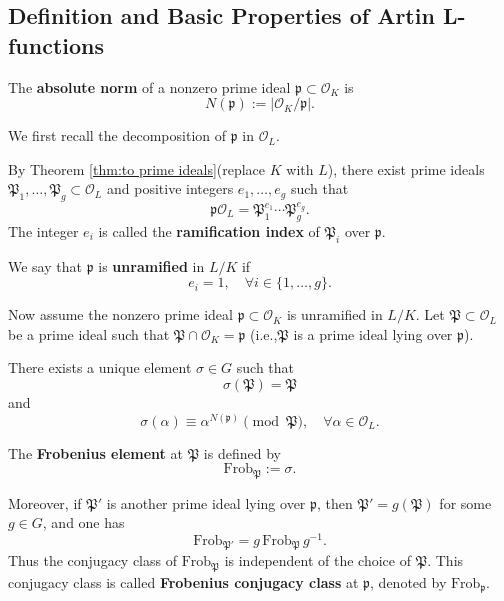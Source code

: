 \subsection{Definition and Basic Properties of Artin L-functions}


\begin{defn}
The \textbf{absolute norm} of  a nonzero prime ideal $\mathfrak p\subset\mathcal O_K$ is 
\[
{N(\mathfrak p) := |\mathcal O_K/\mathfrak p|.}
\]
\end{defn}

We first recall the decomposition of \(\mathfrak{p}\) in \(\mathcal{O}_L\).
\begin{defn}
By Theorem \ref{thm:to prime ideals}(replace $K$ with $L$), there exist prime ideals \(\mathfrak{P}_1, \dots, \mathfrak{P}_g \subset \mathcal{O}_L\) and positive integers \(e_1, \dots, e_g\) such that
\[
\mathfrak{p}\mathcal{O}_L = \mathfrak{P}_1^{e_1} \cdots \mathfrak{P}_g^{e_g}.
\]
The integer \(e_i\) is called the \textbf{ramification index} of \(\mathfrak{P}_i\) over \(\mathfrak{p}\).

We say that \(\mathfrak{p}\) is \textbf{unramified} in \(L/K\) if
\[
e_i = 1 ,\quad \forall i \in\{1, \dots, g\}.
\]
\end{defn}


Now assume the nonzero prime ideal $\mathfrak p\subset\mathcal O_K$ is unramified in \(L/K\). Let \(\mathfrak{P} \subset \mathcal{O}_L\) be a prime ideal such that \(\mathfrak{P} \cap \mathcal{O}_K = \mathfrak{p}\) (i.e.,\(\mathfrak{P}\) is a prime ideal lying over \(\mathfrak{p}\)). 



\begin{lemma}
There exists a unique element $\sigma\in G$ such that
\[
\sigma(\mathfrak{P}) = \mathfrak{P}
\]
and
\[
\sigma(\alpha) \equiv \alpha^{N(\mathfrak{p})} \pmod{\mathfrak{P}},
\quad \forall \alpha \in \mathcal{O}_L.
\]

The \textbf{Frobenius element} at $\mathfrak{P}$ is defined by
\[
\mathrm{Frob}_{\mathfrak{P}} := \sigma.
\]

Moreover, if \(\mathfrak{P}'\) is another prime ideal lying over \(\mathfrak{p}\), then \(\mathfrak{P}' = g(\mathfrak{P})\) for some \(g \in G\), and one has
\[
\mathrm{Frob}_{\mathfrak{P}'} = g \,\mathrm{Frob}_{\mathfrak{P}}\, g^{-1}.
\]
Thus the conjugacy class of \(\mathrm{Frob}_{\mathfrak{P}}\) is independent of the choice of \(\mathfrak{P}\). This conjugacy class is called \textbf{Frobenius conjugacy class} at $\mathfrak{p}$, denoted by $\mathrm{Frob}_{\mathfrak{p}}$.
\end{lemma}


